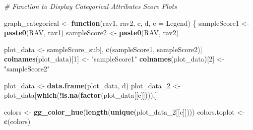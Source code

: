 \documentclass[
]{article}
\newenvironment{Shaded}{\begin{snugshade}}{\end{snugshade}}
\newcommand{\AttributeTok}[1]{\textcolor[rgb]{0.13,0.29,0.53}{#1}}
\newcommand{\CommentTok}[1]{\textcolor[rgb]{0.56,0.35,0.01}{\textit{#1}}}
\newcommand{\ControlFlowTok}[1]{\textcolor[rgb]{0.13,0.29,0.53}{\textbf{#1}}}
\newcommand{\DecValTok}[1]{\textcolor[rgb]{0.00,0.00,0.81}{#1}}
\newcommand{\FunctionTok}[1]{\textcolor[rgb]{0.13,0.29,0.53}{\textbf{#1}}}
\newcommand{\NormalTok}[1]{#1}
\newcommand{\OtherTok}[1]{\textcolor[rgb]{0.56,0.35,0.01}{#1}}
\newcommand{\SpecialCharTok}[1]{\textcolor[rgb]{0.81,0.36,0.00}{\textbf{#1}}}
\newcommand{\StringTok}[1]{\textcolor[rgb]{0.31,0.60,0.02}{#1}}
\begin{document}
\begin{Shaded}
\begin{Highlighting}[]
\CommentTok{\# Function to Display Categorical Attributes\textquotesingle{} Score Plots}

\NormalTok{graph\_categorical }\OtherTok{\textless{}{-}} \ControlFlowTok{function}\NormalTok{(rav1, rav2, c, d, }\AttributeTok{e =} \StringTok{\textquotesingle{}Legend\textquotesingle{}}\NormalTok{) \{}
\NormalTok{  sampleScore1 }\OtherTok{\textless{}{-}} \FunctionTok{paste0}\NormalTok{(}\StringTok{\textquotesingle{}RAV\textquotesingle{}}\NormalTok{, rav1)}
\NormalTok{  sampleScore2 }\OtherTok{\textless{}{-}} \FunctionTok{paste0}\NormalTok{(}\StringTok{\textquotesingle{}RAV\textquotesingle{}}\NormalTok{, rav2)}

\NormalTok{  plot\_data }\OtherTok{\textless{}{-}}\NormalTok{ sampleScore\_sub[, }\FunctionTok{c}\NormalTok{(sampleScore1, sampleScore2)]}
  \FunctionTok{colnames}\NormalTok{(plot\_data)[}\DecValTok{1}\NormalTok{] }\OtherTok{\textless{}{-}} \StringTok{"sampleScore1"}
  \FunctionTok{colnames}\NormalTok{(plot\_data)[}\DecValTok{2}\NormalTok{] }\OtherTok{\textless{}{-}} \StringTok{"sampleScore2"}

\NormalTok{  plot\_data }\OtherTok{\textless{}{-}} \FunctionTok{data.frame}\NormalTok{(plot\_data, d)}
\NormalTok{  plot\_data\_2 }\OtherTok{\textless{}{-}}\NormalTok{ plot\_data[}\FunctionTok{which}\NormalTok{(}\SpecialCharTok{!}\FunctionTok{is.na}\NormalTok{(}\FunctionTok{factor}\NormalTok{(plot\_data[[c]]))),]}

\NormalTok{  colors }\OtherTok{\textless{}{-}} \FunctionTok{gg\_color\_hue}\NormalTok{(}\FunctionTok{length}\NormalTok{(}\FunctionTok{unique}\NormalTok{(plot\_data\_2[[c]])))}
\NormalTok{  colors.toplot }\OtherTok{\textless{}{-}} \FunctionTok{c}\NormalTok{(colors)}


\end{Highlighting}
\end{Shaded}
\end{document}
